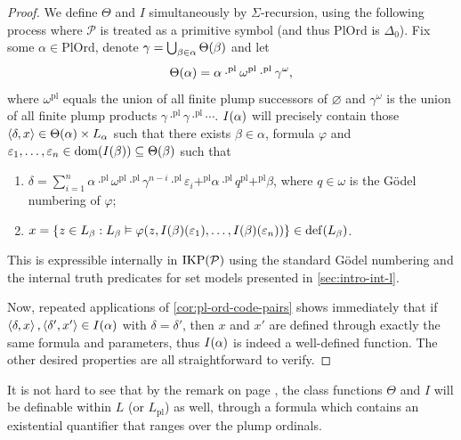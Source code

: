 \documentclass[12pt,openany]{book}
\theoremstyle{plain}
\theoremstyle{definition}
\newcommand\uplabel[1]{\textup{(#1)}}
\newcommand\tuple[1]{\left\langle #1 \right\rangle}
\newcommand\Pow{\mathcal{P}}
\DeclareMathOperator\dd{def}
\newcommand\IKPP{\mathrm{IKP}\mleft(\Pow\mright)}
\newcommand\PlOrd{\mathrm{PlOrd}}
\newcommand\pl{\mathrm{pl}}
\begin{document}
\begin{proof}
  We define $\Theta$ and $I$ simultaneously by $\Sigma$-recursion, using the following process where $\Pow$ is treated as a primitive symbol (and thus $\PlOrd$ is $\Delta_0$). Fix some $\alpha \in \PlOrd$, denote $\gamma = \bigcup_{\beta \in \alpha} \Theta\mleft(\beta\mright)$ and let
  \[\Theta\mleft(\alpha\mright) = \alpha \cdot^\pl \omega^\pl \cdot^\pl \gamma^\omega,\]
  where $\omega^\pl$ equals the union of all finite plump successors of $\varnothing$ and $\gamma^\omega$ is the union of all finite plump products $\gamma \cdot^\pl \gamma \cdot^\pl \cdots$. $I\mleft(\alpha\mright)$ will precisely contain those $\tuple{\delta, x} \in \Theta\mleft(\alpha\mright) \times L_\alpha$ such that there exists $\beta \in \alpha$, formula $\varphi$ and $\varepsilon_1, \ldots, \varepsilon_n \in \mathrm{dom}\mleft(I\mleft(\beta\mright)\mright) \subseteq \Theta\mleft(\beta\mright)$ such that
  \begin{enumerate}[label=\uplabel{\roman*}]
    \item $\delta = \sum_{i = 1}^n \alpha \cdot^\pl \omega^\pl \cdot^\pl \gamma^{n - i} \cdot^\pl \varepsilon_i +^\pl \alpha \cdot^\pl q^\pl +^\pl \beta$, where $q \in \omega$ is the G\"odel numbering of $\varphi$;
    \item $x = \left\{z \in L_\beta : L_\beta \vDash \varphi\mleft(z, I\mleft(\beta\mright)\mleft(\varepsilon_1\mright), \ldots, I\mleft(\beta\mright)\mleft(\varepsilon_n\mright)\mright)\right\} \in \dd\mleft(L_\beta\mright)$.
  \end{enumerate}
  This is expressible internally in $\IKPP$ using the standard G\"odel numbering and the internal truth predicates for set models presented in \autoref{sec:intro-int-l}.

  Now, repeated applications of \autoref{cor:pl-ord-code-pairs} shows immediately that if $\tuple{\delta, x}, \tuple{\delta', x'} \in I\mleft(\alpha\mright)$ with $\delta = \delta'$, then $x$ and $x'$ are defined through exactly the same formula and parameters, thus $I\mleft(\alpha\mright)$ is indeed a well-defined function. The other desired properties are all straightforward to verify.
\end{proof}

It is not hard to see that by the remark on page \pageref{loc:l-pl-rec-impl-remark}, the class functions $\Theta$ and $I$ will be definable within $L$ (or $L_\pl$) as well, through a formula which contains an existential quantifier that ranges over the plump ordinals.
\end{document}
